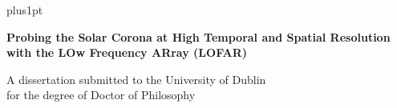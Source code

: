 \documentclass[a4paper,twoside,12pt,usenatbib]{Latex/Classes/PhDthesisPSnPDF}
\begin{document}

\renewcommand\baselinestretch{1.2}
\baselineskip=18pt plus1pt


\newcommand{\titlefont}{\bfseries \fontsize{22}{26.42pt}\selectfont}
\newcommand{\largetitlefont}{\bfseries \fontsize{29.88}{35.88pt}\selectfont}
\newcommand{\othertitlefont}{\fontsize{14.4}{17.28}\selectfont}
\newcommand{\authorfont}{\bfseries \fontsize{14.4}{17.28}\selectfont}
\newcommand{\informationfont}{\fontsize{10}{12}\selectfont}
\newcommand{\dedicationfont}{\slshape \fontsize{14.4}{17.28}\selectfont}

\newcommand{\thisyear}{\number\year}
\def\thismonth{\ifcase\month\or January\or February\or March\or
  April\or May\or June\or July\or August\or September\or October\or November\or December\fi}
\newcommand{\todaysdate}{\thismonth\space \thisyear}

\renewcommand{\baselinestretch}{1}
\newpage \thispagestyle{empty}
\begin{flushright}



\Huge{\textbf{Probing the Solar Corona at High Temporal and Spatial Resolution with the LOw Frequency ARray (LOFAR)}}

\end{flushright}

\vspace*{2cm}
\begin{flushright}
A dissertation submitted to the University of Dublin \\
for the degree of Doctor of Philosophy
\end{flushright}
\end{document}
